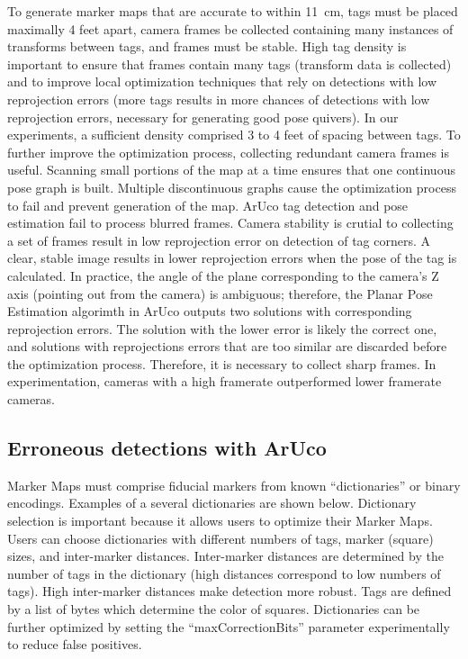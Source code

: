 \documentclass{article}
\begin{document}
    To generate marker maps that are accurate to within \SI{11}{\centi\meter}, tags must be placed maximally 4 feet apart, camera frames be collected containing many instances of transforms between tags, and frames must be stable. High tag density is important to ensure that frames contain many tags (transform data is collected) and to improve local optimization techniques that rely on detections with low reprojection errors (more tags results in more chances of detections with low reprojection errors, necessary for generating good pose quivers)\cite{munoz-salinas_rafael_mapping_2016}. In our experiments, a sufficient density comprised 3 to 4 feet of spacing between tags. To further improve the optimization process, collecting redundant camera frames is useful. Scanning small portions of the map at a time ensures that one continuous pose graph is built. Multiple discontinuous graphs cause the optimization process to fail and prevent generation of the map. ArUco tag detection and pose estimation fail to process blurred frames. Camera stability is crutial to collecting a set of frames result in low reprojection error on detection of tag corners. A clear, stable image results in lower reprojection errors when the pose of the tag is calculated. In practice, the angle of the plane corresponding to the camera's Z axis (pointing out from the camera) is ambiguous; therefore, the Planar Pose Estimation algorimth in ArUco outputs two solutions with corresponding reprojection errors. The solution with the lower error is likely the correct one, and solutions with reprojections errors that are too similar are discarded before the optimization process\cite{munoz-salinas_rafael_mapping_2016}. Therefore, it is necessary to collect sharp frames. In experimentation, cameras with a high framerate outperformed lower framerate cameras.

	\subsection{Erroneous detections with ArUco}

    Marker Maps must comprise fiducial markers from known ``dictionaries'' or binary encodings. Examples of a several dictionaries are shown below. Dictionary selection is important because it allows users to optimize their Marker Maps. Users can choose dictionaries with different numbers of tags, marker (square) sizes, and inter-marker distances. Inter-marker distances are determined by the number of tags in the dictionary (high distances correspond to low numbers of tags). High inter-marker distances make detection more robust. Tags are defined by a list of bytes which determine the color of squares. Dictionaries can be further optimized by setting the ``maxCorrectionBits'' parameter experimentally to reduce false positives\cite{open_source_computer_vision_detection_2015}.
\end{document}
